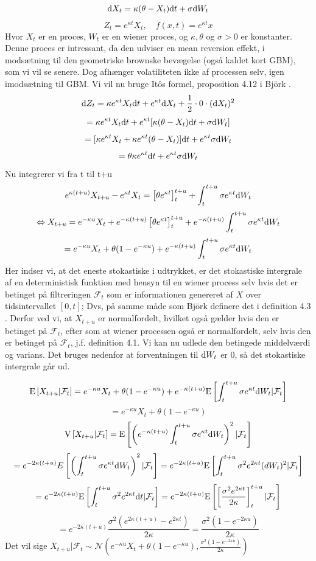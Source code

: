 \documentclass{article}
\theoremstyle{definition}
\theoremstyle{remark}
\newcommand\ens{\Leftrightarrow}
\begin{document}
$$\text d X_t = \kappa(\theta - X_t)\text dt+\sigma \text dW_t$$
$$Z_t=e^{\kappa t}X_t,\quad f(x,t)= e^{\kappa t}x$$
Hvor $X_t$ er en proces, $W_t$ er en wiener proces, og $\kappa,\theta$ og $\sigma>0$ er konstanter. Denne proces er intressant, da den udviser en mean reversion effekt, i modsætning til den geometriske brownske bevægelse (også kaldet kort GBM), som vi vil se senere. Dog afhænger volatiliteten ikke af processen selv, igen imodsætning til GBM. Vi vil nu bruge Itôs formel, proposition 4.12 i Björk  \cite{Bjork2020}.
$$\text dZ_t = \kappa e^{\kappa t}X_t\text dt + e^{\kappa t}\text dX_t +\frac12\cdot0\cdot(\text dX_t)^2$$
$$=\kappa e^{\kappa t}X_t\text dt + e^{\kappa t}[\kappa(\theta - X_t)\text dt +\sigma \text dW_t]$$
$$=[\kappa e^{\kappa t}X_t+\kappa e^{\kappa t}(\theta - X_t)]\text dt + e^{\kappa t}\sigma \text dW_t$$
$$=\theta\kappa e^{\kappa t}\text dt + e^{\kappa t}\sigma \text dW_t$$
Nu integrerer vi fra t til t+u
$$e^{\kappa(t+u)}X_{t+u}-e^{\kappa t}X_t=\left[\theta e^{\kappa t}\right]_{t}^{t+u}+\int_{t}^{t+u}\sigma e^{\kappa t}\text d W_t$$
$$\ens X_{t+u}=e^{-\kappa u}X_t + e^{-\kappa(t+u)}\left[\theta e^{\kappa t}\right]_{t}^{t+u}+e^{-\kappa(t+u)}\int_{t}^{t+u}\sigma e^{\kappa t}\text d W_t$$
$$=e^{-\kappa u}X_t + \theta(1-e^{-\kappa u})+e^{-\kappa(t+u)}\int_{t}^{t+u}\sigma e^{\kappa t}\text d W_t$$
Her indser vi, at det eneste stokastiske i udtrykket, er det stokastiske intergrale af en deterministisk funktion med hensyn til en wiener process selv hvis det er betinget på filtreringen $\mathcal F_t$ som er informationen genereret af $X$ over tidsintervallet $[0,t]$; Dvs, på samme måde som Björk definere det i definition 4.3 \cite{Bjork2020}. Derfor ved vi, at $X_{t+u}$ er normalfordelt, hvilket også gælder hvis den er betinget på $\mathcal F_t$, efter som at wiener processen også er normalfordelt, selv hvis den er betinget på $\mathcal F_t$, j.f. \cite{Bjork2020} definition 4.1. Vi kan nu udlede den betingede middelværdi og varians. Det bruges nedenfor at forventningen til $\text dW_t$ er 0, så det stokastiske intergrale går ud.

$$\text E\left[X_{t+u}|\mathcal F_t\right] = e^{-\kappa u}X_t + \theta(1-e^{-\kappa u}) + e^{-\kappa(t+u)}\text E\left[\int_{t}^{t+u}\sigma e^{\kappa t}\text d W_t|\mathcal F_t\right]$$
$$=e^{-\kappa u}X_t + \theta(1-e^{-\kappa u})$$
$$\text V\left[X_{t+u}|\mathcal F_t\right]= \text E\left[\left(e^{-\kappa(t+u)}\int_{t}^{t+u}\sigma e^{\kappa t}\text d W_t\right)^2|\mathcal F_t\right]$$
$$= e^{-2\kappa(t+u)}E\left[\left(\int_{t}^{t+u}\sigma e^{\kappa t}\text d W_t\right)^2|\mathcal F_t\right]= e^{-2\kappa(t+u)}\text E \left[\int_{t}^{t+u}\sigma^2 e^{2\kappa t}\text (d W_t)^2|\mathcal F_t\right]$$
$$=e^{-2\kappa(t+u)}\text E \left[\int_{t}^{t+u}\sigma^2 e^{2\kappa t}\text dt|\mathcal F_t\right]=e^{-2\kappa(t+u)}\text E \left[\left[\frac{\sigma^2 e^{2\kappa t}}{2\kappa}\right]_{t}^{t+u}|\mathcal F_t\right]$$
$$=e^{-2\kappa(t+u)}\frac{\sigma^2 (e^{2\kappa (t+u)}-e^{2\kappa t})}{2\kappa}=\frac{\sigma^2 (1-e^{-2\kappa u})}{2\kappa}$$
Det vil sige $X_{t+u}|\mathcal F_t\sim\mathcal N\left(e^{-\kappa u}X_t + \theta(1-e^{-\kappa u}),\frac{\sigma^2 (1-e^{-2\kappa u})}{2\kappa}\right)$
\end{document}
